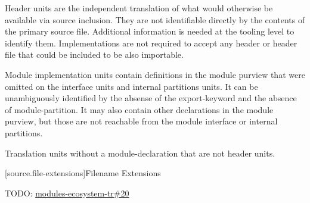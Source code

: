 %
%
%
Header units are the independent translation of what would otherwise
be available via source inclusion. They are not identifiable directly
by the contents of the primary source file. Additional information is
needed at the tooling level to identify them. Implementations are not
required to accept any header or header file that could be included to
be also importable.

%
%
%
Module implementation units contain definitions in the module purview
that were omitted on the interface units and internal partitions
units. It can be unambiguously identified by the absense of the
export-keyword and the absence of module-partition. It may also
contain other declarations in the module purview, but those are not
reachable from the module interface or internal partitions.

%
%
%
Translation units without a module-declaration that are not header
units.

[source.file-extensions]{Filename Extensions}

\pnum TODO: \href{https://github.com/cplusplus/modules-ecosystem-tr/issues/20}{modules-ecosystem-tr\#20}

%

